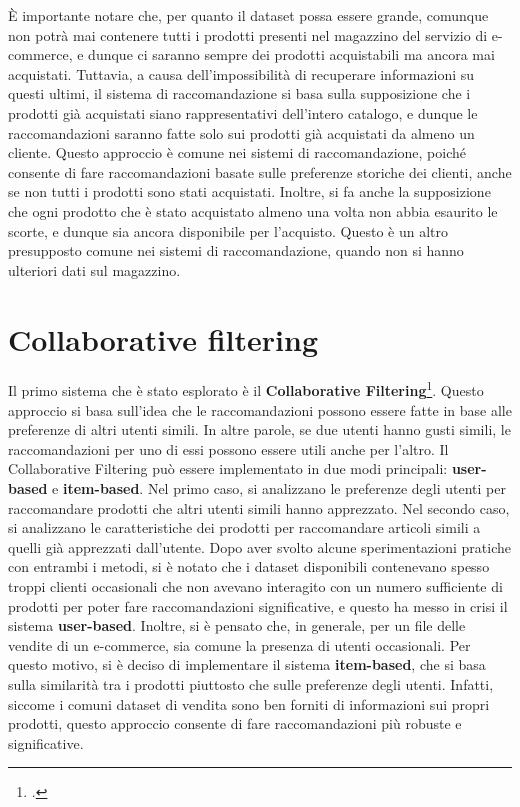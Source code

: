 È importante notare che, per quanto il dataset possa essere grande, comunque non potrà mai contenere tutti i prodotti presenti nel magazzino del servizio di e-commerce, e dunque ci saranno sempre dei prodotti acquistabili ma ancora mai acquistati. Tuttavia, a causa dell'impossibilità di recuperare informazioni su questi ultimi, il sistema di raccomandazione si basa sulla supposizione che i prodotti già acquistati siano rappresentativi dell'intero catalogo, e dunque le raccomandazioni saranno fatte solo sui prodotti già acquistati da almeno un cliente. Questo approccio è comune nei sistemi di raccomandazione, poiché consente di fare raccomandazioni basate sulle preferenze storiche dei clienti, anche se non tutti i prodotti sono stati acquistati.
Inoltre, si fa anche la supposizione che ogni prodotto che è stato acquistato almeno una volta non abbia esaurito le scorte, e dunque sia ancora disponibile per l'acquisto. Questo è un altro presupposto comune nei sistemi di raccomandazione, quando non si hanno ulteriori dati sul magazzino.


\section{Collaborative filtering}

Il primo sistema che è stato esplorato è il \textbf{Collaborative Filtering}\footcite{site:collaborative-filtering}. Questo approccio si basa sull'idea che le raccomandazioni possono essere fatte in base alle preferenze di altri utenti simili. In altre parole, se due utenti hanno gusti simili, le raccomandazioni per uno di essi possono essere utili anche per l'altro. Il Collaborative Filtering può essere implementato in due modi principali: \textbf{user-based} e \textbf{item-based}. Nel primo caso, si analizzano le preferenze degli utenti per raccomandare prodotti che altri utenti simili hanno apprezzato. Nel secondo caso, si analizzano le caratteristiche dei prodotti per raccomandare articoli simili a quelli già apprezzati dall'utente. Dopo aver svolto alcune sperimentazioni pratiche con entrambi i metodi, si è notato che i dataset disponibili contenevano spesso troppi clienti occasionali che non avevano interagito con un numero sufficiente di prodotti per poter fare raccomandazioni significative, e questo ha messo in crisi il sistema \textbf{user-based}. Inoltre, si è pensato che, in generale, per un file delle vendite di un e-commerce, sia comune la presenza di utenti occasionali. Per questo motivo, si è deciso di implementare il sistema \textbf{item-based}, che si basa sulla similarità tra i prodotti piuttosto che sulle preferenze degli utenti. Infatti, siccome i comuni dataset di vendita sono ben forniti di informazioni sui propri prodotti, questo approccio consente di fare raccomandazioni più robuste e significative.

